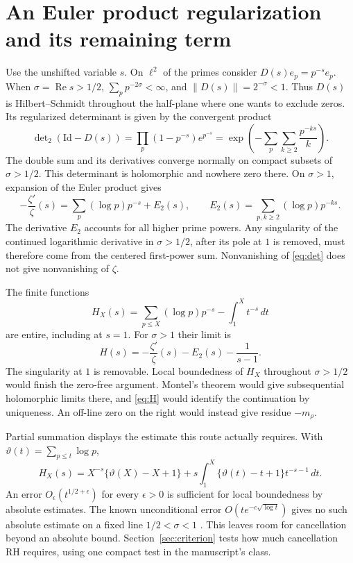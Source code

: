 \documentclass[11pt,letterpaper]{article}
\newcommand{\re}{\operatorname{Re}}\newcommand{\im}{\operatorname{Im}}
\newcommand{\dd}{\,d}\newcommand{\id}{\mathrm{Id}}
\newcommand{\step}[1]{\par\smallskip{\color{ink}\bfseries #1}\enspace}
\newcommand{\partpage}[2]{\clearpage\section{#1}\label{#2}}
\begin{document}
\partpage{An Euler product regularization and its remaining term}{sec:euler}
Use the unshifted variable \(s\). On \(\ell^2\) of the primes consider \(D(s)e_p=p^{-s}e_p\). When \(\sigma=\re s>1/2\), \(\sum_p p^{-2\sigma}<\infty\), and \(\|D(s)\|=2^{-\sigma}<1\). Thus \(D(s)\) is Hilbert--Schmidt throughout the half-plane where one wants to exclude zeros. Its regularized determinant is given by the convergent product
\begin{equation}
 \det\nolimits_2(\id-D(s))
 =\prod_p(1-p^{-s})e^{p^{-s}}
 =\exp\left(-\sum_{p}\sum_{k\ge2}\frac{p^{-ks}}{k}\right).
 \label{eq:det}
\end{equation}
The double sum and its derivatives converge normally on compact subsets of \(\sigma>1/2\). This determinant is holomorphic and nowhere zero there. On \(\sigma>1\), expansion of the Euler product gives
\[
 -\frac{\zeta'}{\zeta}(s)=
       \sum_p (\log p)p^{-s}+E_2(s),\qquad
 E_2(s)=\sum_{p,k\ge2}(\log p)p^{-ks}.
\]
The derivative \(E_2\) accounts for all higher prime powers. Any singularity of the continued logarithmic derivative in \(\sigma>1/2\), after its pole at \(1\) is removed, must therefore come from the centered first-power sum. Nonvanishing of \eqref{eq:det} does not give nonvanishing of \(\zeta\).

\step{Trying to restore the missing first power.}
The finite functions
\[
 H_X(s)=\sum_{p\le X}(\log p)p^{-s}-\int_1^X t^{-s}\dd t
\]
are entire, including at \(s=1\). For \(\sigma>1\) their limit is
\begin{equation}
 H(s)=-\frac{\zeta'}{\zeta}(s)-E_2(s)-\frac{1}{s-1}.
 \label{eq:H}
\end{equation}
The singularity at \(1\) is removable. Local boundedness of \(H_X\) throughout \(\sigma>1/2\) would finish the zero-free argument. Montel's theorem would give subsequential holomorphic limits there, and \eqref{eq:H} would identify the continuation by uniqueness. An off-line zero on the right would instead give residue \(-m_\rho\).

Partial summation displays the estimate this route actually requires. With \(\vartheta(t)=\sum_{p\le t}\log p\),
\[
 H_X(s)=X^{-s}\{\vartheta(X)-X+1\}
      +s\int_1^X\{\vartheta(t)-t+1\}t^{-s-1}\dd t .
\]
An error \(O_\epsilon(t^{1/2+\epsilon})\) for every \(\epsilon>0\) is sufficient for local boundedness by absolute estimates. The known unconditional error \(O(t e^{-c\sqrt{\log t}})\) gives no such absolute estimate on a fixed line \(1/2<\sigma<1\) \cite{jy}. This leaves room for cancellation beyond an absolute bound. Section~\ref{sec:criterion} tests how much cancellation RH requires, using one compact test in the manuscript's class.
\end{document}
